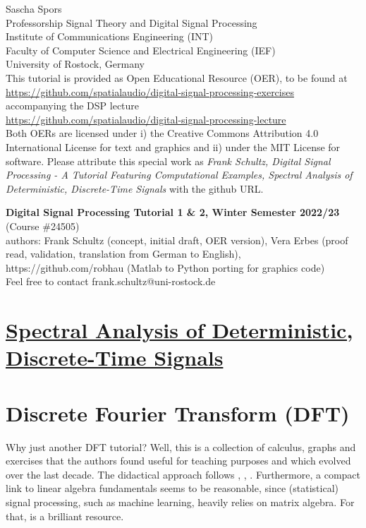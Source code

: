 \documentclass[11pt,a4paper,DIV=12]{scrartcl}
\begin{document}
{\raggedleft Sascha Spors\\
Professorship Signal Theory and Digital Signal Processing\\
Institute of Communications Engineering (INT)\\
Faculty of Computer Science and Electrical Engineering (IEF)\\
University of Rostock, Germany\\}
\vspace{0.5cm}
\noindent This tutorial is provided as Open Educational Resource (OER),
to be found at\\
\url{https://github.com/spatialaudio/digital-signal-processing-exercises}\\
accompanying the DSP lecture\\
\url{https://github.com/spatialaudio/digital-signal-processing-lecture}\\
Both OERs are licensed under i) the Creative Commons Attribution 4.0 International
License for text and graphics and ii) under the MIT License for software.
%
Please attribute this special work as
\textit{Frank Schultz, Digital Signal Processing - A
Tutorial Featuring Computational Examples, Spectral Analysis of Deterministic,
Discrete-Time Signals} with the github URL.
\newline

\textbf{Digital Signal Processing Tutorial 1 \& 2, Winter Semester 2022/23}
(Course \#24505)\\
authors: Frank Schultz (concept, initial draft, OER version),
Vera Erbes (proof read, validation, translation from German to English), https://github.com/robhau
(Matlab to Python porting for graphics code)\\
Feel free to contact frank.schultz@uni-rostock.de

\section*{\underline{Spectral Analysis of Deterministic, Discrete-Time Signals}}
\renewcommand{\contentsname}{}
\tableofcontents
\vspace{.7cm}

\section{Discrete Fourier Transform (DFT)}
Why just another DFT tutorial? Well, this is a collection of calculus,
graphs and exercises that the authors found useful for teaching purposes
and which evolved over the last decade.
%
The didactical approach follows \cite{Rabiner1975}, \cite{Kammeyer2002},
\cite{Moeser2011}.
%
Furthermore, a compact link to linear algebra fundamentals seems to be
reasonable, since (statistical) signal processing, such as machine learning,
heavily relies on matrix algebra. For that, \cite{Strang2019} is a brilliant
resource.
\end{document}
